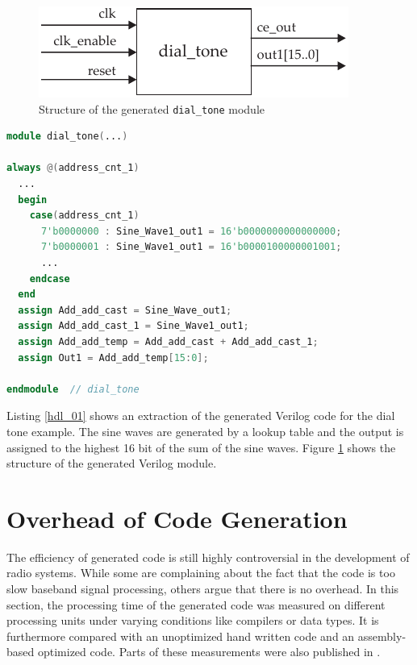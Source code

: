\begin{figure}
	\centering
		\includegraphics{../kapitel02/figures/dial_tone_fpga.pdf}
	\caption{Structure of the generated \texttt{dial\_tone} module}
	\label{fig:dial_tone_fpga}
\end{figure}


\begin{lstlisting}[language=Verilog,columns=flexible,caption= Extraction of the generated Verilog code,label=hdl_01]
module dial_tone(...)

always @(address_cnt_1)
  ...
  begin
    case(address_cnt_1)
      7'b0000000 : Sine_Wave1_out1 = 16'b0000000000000000;
      7'b0000001 : Sine_Wave1_out1 = 16'b0000100000001001;
      ...
    endcase
  end  
  assign Add_add_cast = Sine_Wave_out1;
  assign Add_add_cast_1 = Sine_Wave1_out1;
  assign Add_add_temp = Add_add_cast + Add_add_cast_1;
  assign Out1 = Add_add_temp[15:0];
  
endmodule  // dial_tone
\end{lstlisting}

Listing \ref{hdl_01} shows an extraction of the generated Verilog code for the dial tone example. The sine waves are generated by a lookup table and the output is assigned to the highest 16 bit of the sum of the sine waves. Figure \ref{fig:dial_tone_fpga} shows the structure of the generated Verilog module.

\section{Overhead of Code Generation}
\label{sec:overhead}

The efficiency of generated code is still highly controversial in the development of radio systems. While some are complaining about the fact that the code is too slow baseband signal processing, others argue that there is no overhead. In this section, the processing time of the generated code was measured on different processing units under varying conditions like compilers or data types. It is furthermore compared with an unoptimized hand written code and an assembly-based optimized code. Parts of these measurements were also published in \cite{perf_overhead}.


